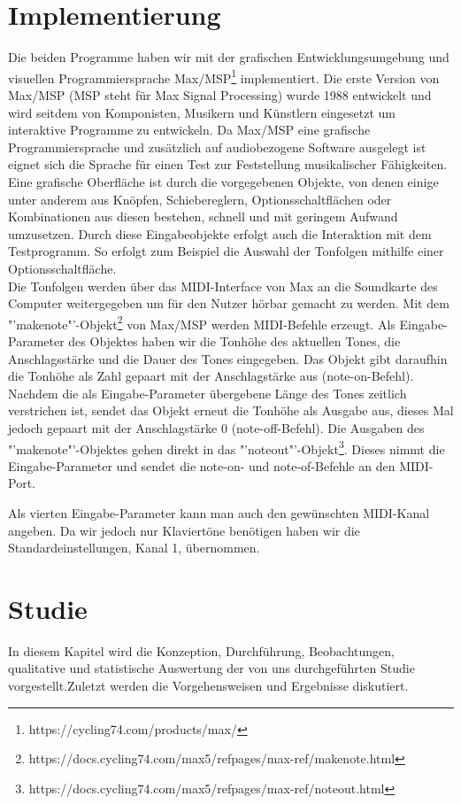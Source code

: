 \documentclass{acm_proc_article-sp}
\begin{document}
\section{Implementierung}
Die beiden Programme haben wir mit der grafischen Entwicklungsumgebung und visuellen Programmiersprache Max/MSP\footnote{https://cycling74.com/products/max/} implementiert. Die erste Version von Max/MSP (MSP steht für Max Signal Processing) \cite{wiki:max} wurde 1988 entwickelt und wird seitdem von Komponisten, Musikern und Künstlern eingesetzt um interaktive Programme zu entwickeln. Da Max/MSP eine grafische Programmiersprache und zusätzlich auf audiobezogene Software ausgelegt ist eignet sich die Sprache für einen Test zur Feststellung musikalischer Fähigkeiten.\\
Eine grafische Oberfläche ist durch die vorgegebenen Objekte, von denen einige unter anderem aus Knöpfen, Schiebereglern, Optionsschaltflächen oder Kombinationen aus diesen bestehen, schnell und mit geringem Aufwand umzusetzen. Durch diese Eingabeobjekte erfolgt auch die Interaktion mit dem Testprogramm. So erfolgt zum Beispiel die Auswahl der Tonfolgen mithilfe einer Optionsschaltfläche.\\
Die Tonfolgen werden über das MIDI-Interface von Max an die Soundkarte des Computer weitergegeben um für den Nutzer hörbar gemacht zu werden. Mit dem "'makenote"'-Objekt\footnote{https://docs.cycling74.com/max5/refpages/max-ref/makenote.html} von Max/MSP werden MIDI-Befehle erzeugt. Als Eingabe-Parameter des Objektes haben wir die Tonhöhe des aktuellen Tones, die Anschlagsstärke und die Dauer des Tones  eingegeben. Das Objekt gibt daraufhin die Tonhöhe als Zahl gepaart mit der Anschlagstärke aus (note-on-Befehl). Nachdem die als Eingabe-Parameter übergebene Länge des Tones zeitlich verstrichen ist, sendet das Objekt erneut die Tonhöhe als Ausgabe aus, dieses Mal jedoch gepaart mit der Anschlagstärke 0 (note-off-Befehl). Die Ausgaben des "'makenote"'-Objektes gehen direkt in das "'noteout"'-Objekt\footnote{https://docs.cycling74.com/max5/refpages/max-ref/noteout.html}. Dieses nimmt die Eingabe-Parameter und sendet die note-on- und note-of-Befehle an den MIDI-Port.


Als vierten Eingabe-Parameter kann man auch den gewünschten MIDI-Kanal angeben. Da wir jedoch nur Klaviertöne benötigen haben wir die Standardeinstellungen, Kanal 1, übernommen.

\section{Studie}
In diesem Kapitel wird die Konzeption, Durchführung, Beobachtungen, qualitative und statistische Auswertung der von uns durchgeführten Studie vorgestellt.Zuletzt werden die Vorgehensweisen und Ergebnisse diskutiert.
\end{document}
